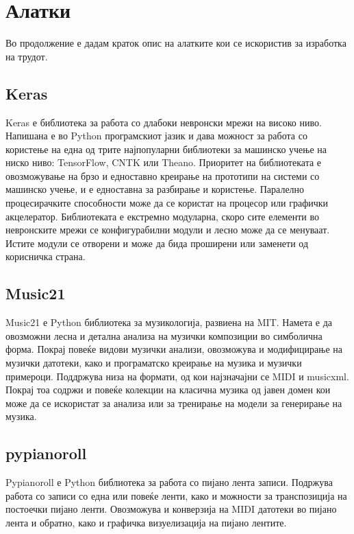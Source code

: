 \chapter{Алатки}
\label{ch:alatki}

Во продолжение е дадам краток опис на алатките кои се искористив за изработка на трудот.

\section{Keras}

Keras е библиотека за работа со длабоки невронски мрежи на високо ниво. Напишана е во Python програмскиот јазик и дава можност за работа со користење на една од трите најпопуларни библиотеки за машинско учење на ниско ниво: TensorFlow, CNTK или Theano. Приоритет на библиотеката е овозможување на брзо и едноставно креирање на прототипи на системи со машинско учење, и е едноставна за разбирање и користење. Паралелно процесирачките способности може да се користат на процесор или графички акцелератор. Библиотеката е екстремно модуларна, скоро сите елементи во невронските мрежи се конфигурабилни модули и лесно може да се менуваат. Истите модули се отворени и може да бида проширени или заменети од корисничка страна.

\section{Music21}

Music21 е Python библиотека за музикологија, развиена на MIT. Намета е да овозможни лесна и детална анализа на музички композиции во симболична форма. Покрај повеќе видови музички анализи, овозможува и модифицирање на музички датотеки, како и програматско креирање на музика и музички примероци. Поддржува низа на формати, од кои најзначајни се MIDI и musicxml. Покрај тоа содржи и повеќе колекции на класична музика од јавен домен кои може да се искористат за анализа или за тренирање на модели за генерирање на музика. 

\section{pypianoroll}

Pypianoroll е Python библиотека за работа со пијано лента записи. Подржува работа со записи со една или повеќе ленти, како и можности за транспозиција на постоечки пијано ленти. Овозможува и конверзија на MIDI датотеки во пијано лента и обратно, како и графичка визуелизација на пијано лентите.

